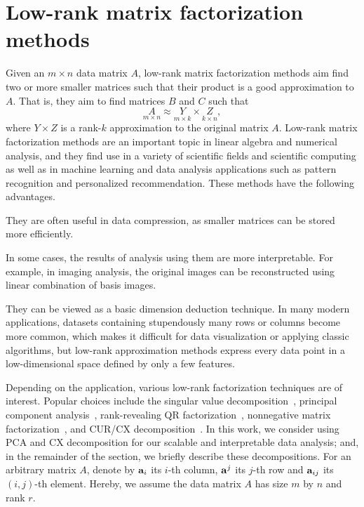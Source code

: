 \section{Low-rank matrix factorization methods}
\label{sxn:low-rank-methods}

Given an $m \times n$ data matrix $A$, low-rank matrix factorization methods aim find two or more smaller matrices such that their product is a good approximation to $A$.
That is, they aim to find matrices $B$ and $C$ such that
\begin{equation}
 \label{eqn:apprx}
    \underset{m\times n}{A} \approx \underset{m\times k}{Y} \times \underset{k\times n}{Z} , 
\end{equation}
where $Y \times Z$ is a rank-$k$ approximation to the original matrix $A$.
Low-rank matrix factorization methods are an important topic in linear algebra and numerical analysis, and they find use in a variety of scientific fields and scientific computing as well as in machine learning and data analysis applications such as pattern recognition and personalized recommendation.
These methods have the following advantages.
\begin{compactitem}
\item
They are often useful in data compression, as smaller matrices can be stored more efficiently.
\item
In some cases, the results of analysis using them are more interpretable.
For example, in imaging analysis, the original images can be reconstructed using linear combination of basis images.
\item
They can be viewed as a basic dimension deduction technique.
In many modern applications, datasets containing stupendously many rows or columns become more common, which makes it difficult for data visualization or applying classic algorithms, but low-rank approximation methods express every data point in a low-dimensional space defined by only a few features.
\end{compactitem}

Depending on the application, various low-rank factorization techniques are of interest. 
Popular choices include the singular value decomposition~\cite{GVL96}, principal component analysis~\cite{pcaBook}, rank-revealing QR factorization~\cite{GE96}, nonnegative matrix factorization~\cite{NMFalg}, and CUR/CX decomposition~\cite{CUR_PNAS}.
In this work, we consider using PCA and CX decomposition for our scalable and interpretable data analysis; and, in the remainder of the section, we briefly describe these decompositions.
For an arbitrary matrix $A$, denote by $\mathbf{a}_i$ its $i$-th column, $\mathbf{a}^j$ its $j$-th row and $\mathbf{a}_{ij}$ its $(i,j)$-th element. 
Hereby, we assume the data matrix $A$ has size $m$ by $n$ and rank $r$.


